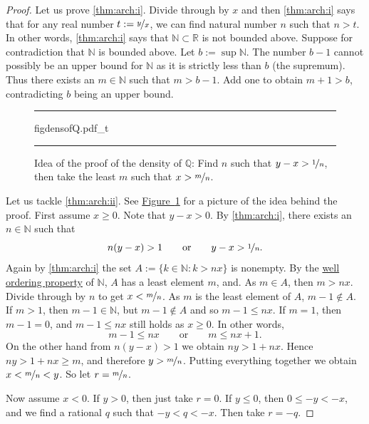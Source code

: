 \documentclass[12pt]{book}
\newenvironment{myfigureht}{%
\begin{figure}[h!t]
\noindent\rule{\textwidth}{0.4pt}\vspace{12pt}\par\centering}%
{\par\noindent\rule{\textwidth}{0.4pt}
\end{figure}}
\newcommand{\R}{{\mathbb{R}}}
\newcommand{\N}{{\mathbb{N}}}
\newcommand{\Q}{{\mathbb{Q}}}
\theoremstyle{plain}
\theoremstyle{remark}
\theoremstyle{definition}
\theoremstyle{exercise}
\theoremstyle{example}
\newcommand{\figureref}[1]{\hyperref[#1]{Figure~\ref*{#1}}}
\begin{document}
\begin{proof}
Let us prove \ref{thm:arch:i}.  Divide through by $x$ and then 
\ref{thm:arch:i} says that for any real number $t:= \nicefrac{y}{x}$,
we can find natural number $n$ such that $n > t$.  In other words,
\ref{thm:arch:i} says that $\N \subset \R$ is not bounded above.
Suppose for contradiction that $\N$ is bounded above.  Let $b := \sup \N$.
The number $b-1$ cannot possibly be an upper bound for $\N$ as it is strictly
less than $b$ (the supremum).  Thus there exists an $m \in \N$ such that $m > b-1$.
Add one to obtain $m+1 > b$, contradicting $b$ being an
upper bound.

\begin{myfigureht}
{figdensofQ.pdf_t}
\caption{Idea of the proof of the density of $\Q$: Find $n$ such that $y-x >
\nicefrac{1}{n}$, then take the least $m$ such that $x >
\nicefrac{m}{n}$.\label{figdensofQ}}
\end{myfigureht}
Let us tackle \ref{thm:arch:ii}.
See \figureref{figdensofQ}
for a picture of the idea behind the proof.
First assume $x \geq 0$.
Note that $y-x > 0$.
By \ref{thm:arch:i}, there exists an $n \in \N$ such that
\begin{equation*}
n(y-x) > 1
\qquad \text{or} \qquad
y-x > \nicefrac{1}{n}.
\end{equation*}
Again by \ref{thm:arch:i} the set 
$A := \{ k \in \N : k > nx \}$ is nonempty.  By the
\hyperlink{wop:link}{well ordering property}
of $\N$, $A$ has a least element $m$, and.  As $m \in A$,
then $m > nx$.
Divide through by $n$ to get $x < \nicefrac{m}{n}$.
As $m$ is the least
element of $A$, $m-1 \notin A$.
If $m > 1$, then $m-1 \in \N$, but $m-1 \notin A$ and so $m-1 \leq nx$.
If $m=1$,
then $m-1 = 0$, and $m-1 \leq nx$ still holds as $x \geq 0$.
In other words,
\begin{equation*}
m-1 \leq nx \qquad \text{or} \qquad m \leq nx+1 . %
\end{equation*}
On the other hand
from $n(y-x) > 1$ we obtain $ny > 1+nx$.
Hence $ny > 1+nx \geq m$, and therefore $y > \nicefrac{m}{n}$.
Putting everything together we obtain $x < \nicefrac{m}{n} < y$.
So let $r = \nicefrac{m}{n}$.

Now assume $x < 0$.  If $y > 0$, then just take $r=0$.  If
$y \leq 0$, then $0 \leq -y < -x$, and we
find a rational $q$ such that $-y < q < -x$.  Then take $r = -q$.
\end{proof}
\end{document}
